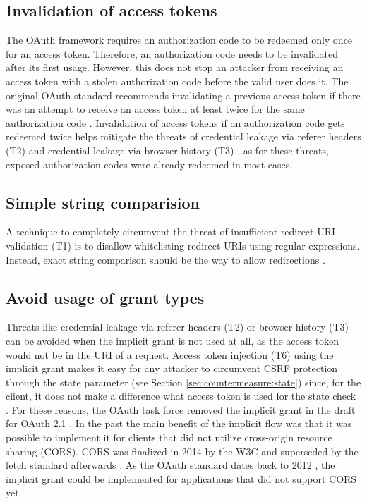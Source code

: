 \documentclass[
    fontsize=12pt,
    headings=small,
    parskip=half,           %
    bibliography=totoc,
    numbers=noenddot,       %
    open=any,               %
    ]{scrreprt}
\begin{document}
\subsection{Invalidation of access tokens}
The OAuth framework requires an authorization code to be redeemed only once for an access token. Therefore, an authorization code needs to be invalidated after its first usage. However, this does not stop an attacker from receiving an access token with a stolen authorization code before the valid user does it. The original OAuth standard recommends invalidating a previous access token if there was an attempt to receive an access token at least twice for the same authorization code \cite{hardt2012rfc}. Invalidation of access tokens if an authorization code gets redeemed twice helps mitigate the threats of credential leakage via referer headers (T2) and credential leakage via browser history (T3) \cite{lodderstedt2020oauth}, as for these threats, exposed authorization codes were already redeemed in most cases.

\subsection{Simple string comparision}
A technique to completely circumvent the threat of insufficient redirect URI validation (T1) is to disallow whitelisting redirect URIs using regular expressions. Instead, exact string comparison should be the way to allow redirections \cite{lodderstedt2020oauth}.

\subsection{Avoid usage of grant types}
Threats like credential leakage via referer headers (T2) or browser history (T3) can be avoided when the implicit grant is not used at all, as the access token would not be in the URI of a request. Access token injection (T6) using the implicit grant makes it easy for any attacker to circumvent CSRF protection through the state parameter (see Section \ref{sec:countermeasure:state}) since, for the client, it does not make a difference what access token is used for the state check \cite{lodderstedt2020oauth}. For these reasons, the OAuth task force removed the implicit grant in the draft for OAuth 2.1 \cite{hardt2023rfc}. In the past the main benefit of the implicit flow was that it was possible to implement it for clients that did not utilize cross-origin resource sharing (CORS). CORS was finalized in 2014 by the W3C and superseded by the fetch standard afterwards \cite{vanKesteren2014}. As the OAuth standard dates back to 2012 \cite{hardt2012rfc}, the implicit grant could be implemented for applications that did not support CORS yet.
\end{document}
